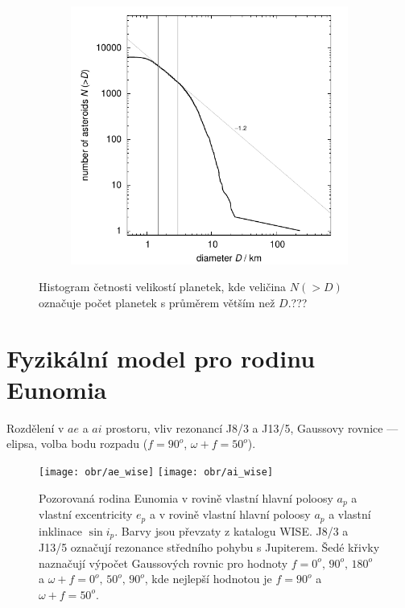 \documentclass[A4paper, 12pt, oneside]{book}
\begin{document}
\begin{figure}[!htb]
\begin{subfigure}[b]{0.45\textwidth}
	\includegraphics[width=\textwidth]{obr/size_distribution_SMALLD}
	\end{subfigure}
	\caption{Histogram četnosti velikostí planetek, kde veličina $N(>D)$ označuje počet planetek s průměrem větším než $D$.???}
	\label{size_distribution}
\end{figure}
\section{Fyzikální model pro rodinu Eunomia}
Rozdělení v $ae$ a $ai$ prostoru, vliv rezonancí J8/3 a J13/5, Gaussovy rovnice --- elipsa, volba bodu rozpadu ($f=90^o$, $\omega+f=50^o$).
\begin{figure}[!htb]
	\centering
	\texttt{[image: obr/ae\_wise]}
	\texttt{[image: obr/ai\_wise]}
	\caption{Pozorovaná rodina Eunomia v rovině vlastní hlavní poloosy $a_p$ a vlastní excentricity $e_p$ a v rovině vlastní hlavní poloosy $a_p$ a vlastní inklinace $\sin i_p$. Barvy jsou převzaty z katalogu WISE. J8/3 a J13/5 označují rezonance středního pohybu s Jupiterem. Šedé křivky naznačují výpočet Gaussových rovnic pro hodnoty $f=0^o,\,90^o,\,180^o$ a $\omega+f=0^o,\, 50^o,\, 90^o$, kde nejlepší hodnotou je $f=90^o$ a $\omega+f=50^o$.}
	\label{ae_ai_wise}
\end{figure}
\end{document}
